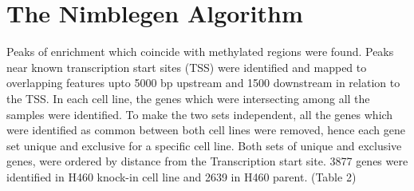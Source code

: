 \documentclass[11pt]{article}
\begin{document}
%
%
%
%
%
%
%
%
%
%
%
%
%

%
%
%
%
%


\section*{The Nimblegen Algorithm}

Peaks of enrichment which coincide with methylated regions were found. Peaks near known transcription start sites (TSS) were identified and mapped to overlapping features upto 5000 bp upstream and 1500 downstream in relation to the TSS. In each cell line, the genes which were intersecting among all the samples were identified. To make the two sets independent, all the genes which were identified as common between both cell lines were removed, hence each gene set unique and exclusive for a specific cell line. Both sets of unique and exclusive genes, were ordered by distance from the Transcription start site. 3877 genes were identified in H460 knock-in cell line and 2639 in H460 parent. (Table 2)
\end{document}
